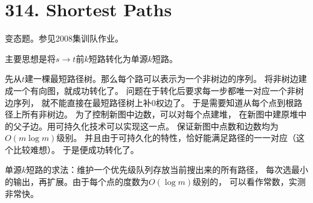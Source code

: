 \section{314. Shortest Paths}
变态题。参见2008集训队作业。\par
主要思想是将$s \to t$前$k$短路转化为单源$k$短路。\par
先从$t$建一棵最短路径树。那么每个路可以表示为一个非树边的序列。
将非树边建成一个有向图，就成功转化了。
问题在于转化后要求每一步都唯一对应一个非树边序列，
就不能直接在最短路径树上补0权边了。
于是需要知道从每个点到根路径上所有非树边。
为了控制新图中边数，可以对每个点建堆，
在新图中建原堆中的父子边。用可持久化技术可以实现这一点。
保证新图中点数和边数均为$O(m\log m)$级别。
并且由于可持久化的特性，恰好能满足路径的一一对应（这个比较难想）。
于是便成功转化了。
\par 
单源$k$短路的求法：维护一个优先级队列存放当前搜出来的所有路径，
每次选最小的输出，再扩展。由于每个点的度数为$O(\log m)$级别的，
可以看作常数，实测非常快。

